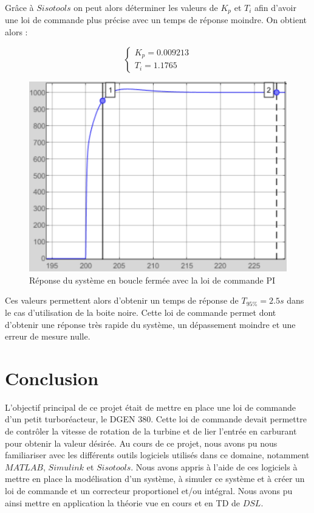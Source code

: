 \documentclass[12pt]{report}
\begin{document}
Grâce à $Sisotools$ on peut alors déterminer les valeurs de $K_p$ et $T_i$ afin d'avoir
une loi de commande plus précise avec un temps de réponse moindre. On obtient alors :

\vspace{0.2cm}
\begin{equation}
  \left\{
  \begin{matrix}
  K_p = 0.009213 \\
  T_i = 1.1765
  \end{matrix}
  \right.
\end{equation}

\begin{figure}[!h]
  \centering
  \includegraphics[scale=0.32]{./fig/PI_response.png}
  \caption{Réponse du système en boucle fermée avec la loi de commande PI}
\end{figure}

Ces valeurs permettent alors d'obtenir un temps de réponse de $T_{95\%} = 2.5s$ dans
le cas d'utilisation de la boite noire. Cette loi de commande permet dont d'obtenir 
une réponse très rapide du système, un dépassement moindre et une erreur de mesure nulle.

\newpage

\chapter{Conclusion}

L'objectif principal de ce projet était de mettre en place une loi de commande
d'un petit turboréacteur, le DGEN 380. Cette loi de commande devait permettre de
contrôler la vitesse de rotation de la turbine et de lier l'entrée en carburant
pour obtenir la valeur désirée. Au cours de ce projet, nous avons pu nous familiariser
avec les différents outils logiciels utilisés dans ce domaine, notamment $MATLAB$,
$Simulink$ et $Sisotools$. Nous avons appris à l'aide de ces logiciels à mettre 
en place la modélisation d'un système, à simuler ce système et à créer un loi de
commande et un correcteur proportionel et/ou intégral. Nous avons pu ainsi mettre
en application la théorie vue en cours et en TD de $DSL$.
\end{document}
